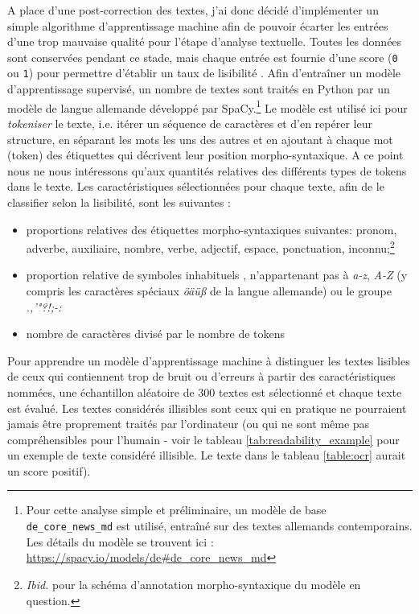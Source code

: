 \documentclass[a4paper,twoside,12pt]{article}
\begin{document}
A place d'une post-correction des textes, j'ai donc décidé d'implémenter un simple algorithme d'apprentissage machine afin de pouvoir écarter les entrées d'une trop mauvaise qualité pour l'étape d'analyse textuelle. Toutes les données sont conservées pendant ce stade, mais chaque entrée est fournie d'une score (\texttt{0} ou \texttt{1}) pour permettre d'établir un taux de \og lisibilité \fg{}. Afin d'entraîner un modèle d'apprentissage supervisé, un nombre de textes sont traités en Python par un modèle de langue allemande développé par SpaCy.\footnote{Pour cette analyse simple et préliminaire, un modèle de base \texttt{de\_core\_news\_md} est utilisé, entraîné sur des textes allemands contemporains. Les détails du modèle se trouvent ici : \url{https://spacy.io/models/de\#de\_core\_news\_md}\label{de_core_news}} Le modèle est utilisé ici pour \textit{tokeniser} le texte, i.e. itérer un séquence de caractères et d'en repérer leur structure, en séparant les mots les uns des autres et en ajoutant à chaque mot (token) des étiquettes qui décrivent leur position morpho-syntaxique. A ce point nous ne nous intéressons qu'aux quantités relatives des différents types de tokens dans le texte. Les caractéristiques sélectionnées pour chaque texte, afin de le classifier selon la lisibilité, sont les suivantes :
\vspace{1ex}
\begin{itemize}[label=$\bullet$]
    \item proportions relatives des étiquettes morpho-syntaxiques suivantes: pronom, adverbe, auxiliaire, nombre, verbe, adjectif, espace, ponctuation, inconnu;\footnote{\textit{Ibid.} pour la schéma d'annotation morpho-syntaxique du modèle en question.}
    \item proportion relative de symboles \og inhabituels \fg{}, n'appartenant pas à \textit{a-z}, \textit{A-Z} (y compris les caractères spéciaux \textit{öäüß} de la langue allemande) ou le groupe \mbox{\textit{.,'"?!;-:}}
    \item nombre de caractères divisé par le nombre de tokens
\end{itemize}
\vspace{2ex}

Pour apprendre un modèle d'apprentissage machine à distinguer les textes lisibles de ceux qui contiennent trop de bruit ou d'erreurs à partir des caractéristiques nommées, une échantillon aléatoire de 300 textes est sélectionné et chaque texte est évalué. Les textes considérés illisibles sont ceux qui en pratique ne pourraient jamais être proprement traités par l'ordinateur (ou qui ne sont même pas compréhensibles pour l'humain - voir le tableau \ref{tab:readability_example} pour un exemple de texte considéré illisible. Le texte dans le tableau \ref{table:ocr} aurait un score positif).
\end{document}
